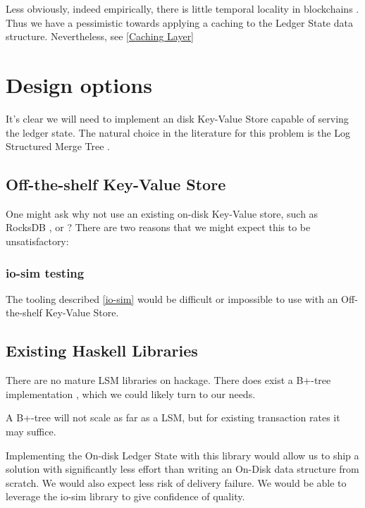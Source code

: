 \documentclass[11pt,a4paper]{article}
\begin{document}
Less obviously, indeed empirically, there is little temporal locality in blockchains .
Thus we have a pessimistic towards applying a caching to the Ledger State data structure. Nevertheless, see \ref{Caching Layer}

\section{Design options}
\label{options}

It's clear we will need to implement an disk Key-Value Store capable of serving
the ledger state. The natural choice in the literature for this problem is the Log Structured Merge Tree . 

\subsection{Off-the-shelf Key-Value Store}


One might ask why not use an existing on-disk Key-Value store, such as
RocksDB , or ? There are two
reasons that we might expect this to be unsatisfactory:

\subsubsection{io-sim testing}
The tooling described \ref{io-sim} would be difficult or impossible to use with
an Off-the-shelf Key-Value Store.

\subsection{Existing Haskell Libraries}

There are no mature LSM libraries on hackage. There does exist a B+-tree
implementation ,
which we could likely turn to our needs.

A B+-tree will not scale as far as a LSM, but for existing transaction rates it
may suffice.

Implementing the On-disk Ledger State with this library would allow us to ship a
solution with significantly less effort than writing an On-Disk data structure
from scratch. We would also expect less risk of delivery failure. We would be
able to leverage the io-sim library to give confidence of quality.
\end{document}

